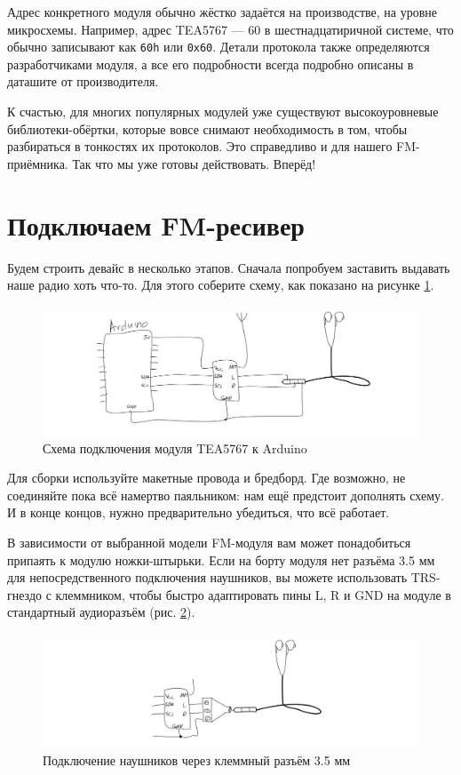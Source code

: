 Адрес конкретного модуля обычно жёстко задаётся на производстве, на уровне микросхемы. Например, адрес TEA5767 — 60 в шестнадцатиричной системе, что обычно записывают как \texttt{60h} или \texttt{0x60}.  Детали протокола также определяются разработчиками модуля, а все его подробности всегда подробно описаны в даташите от производителя.

К счастью, для многих популярных модулей уже существуют высокоуровневые библиотеки-обёртки, которые вовсе снимают необходимость в том, чтобы разбираться в тонкостях их протоколов. Это справедливо и для нашего FM-приёмника. Так что мы уже готовы действовать. Вперёд!

\section{Подключаем FM-ресивер}

Будем строить девайс в несколько этапов. Сначала попробуем заставить выдавать наше радио хоть что-то. Для этого соберите схему, как показано на рисунке \ref{fig:tea5767-wiring}.

\begin{figure}
  \centering
  \includegraphics{sketches/tea5767-wiring}
  \caption{Схема подключения модуля TEA5767 к Arduino}
  \label{fig:tea5767-wiring}
\end{figure}

Для сборки используйте макетные провода и бредборд. Где возможно, не соединяйте пока всё намертво паяльником: нам ещё предстоит дополнять схему. И в конце концов, нужно предварительно убедиться, что всё работает.

В зависимости от выбранной модели FM-модуля вам может понадобиться припаять к модулю ножки-штырьки. Если на борту модуля нет разъёма 3.5 мм для непосредственного подключения наушников, вы можете использовать TRS-гнездо с клеммником, чтобы быстро адаптировать пины L, R и GND на модуле в стандартный аудиоразъём (рис. \ref{fig:trs-35-mm}).

\begin{figure}
  \centering
  \includegraphics{sketches/trs-35-mm}
  \caption{Подключение наушников через клеммный разъём 3.5 мм}
  \label{fig:trs-35-mm}
\end{figure}

